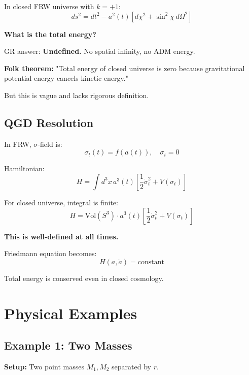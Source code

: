 \documentclass[11pt,a4paper]{article}
\theoremstyle{definition}
\theoremstyle{remark}
\begin{document}
	In closed FRW universe with $k = +1$:
	\begin{equation}
		ds^2 = dt^2 - a^2(t)[d\chi^2 + \sin^2\chi\,d\Omega^2]
	\end{equation}
	
	\textbf{What is the total energy?}
	
	GR answer: \textbf{Undefined.} No spatial infinity, no ADM energy.
	
	\textbf{Folk theorem:} "Total energy of closed universe is zero because gravitational potential energy cancels kinetic energy."
	
	But this is vague and lacks rigorous definition.
	
	\subsection{QGD Resolution}
	
	In FRW, $\sigma$-field is:
	\begin{equation}
		\sigma_t(t) = f(a(t)), \quad \sigma_i = 0
	\end{equation}
	
	Hamiltonian:
	\begin{equation}
		H = \int d^3x\,a^3(t)\left[\frac{1}{2}\dot{\sigma}_t^2 + V(\sigma_t)\right]
	\end{equation}
	
	For closed universe, integral is finite:
	\begin{equation}
		H = \text{Vol}(S^3) \cdot a^3(t)\left[\frac{1}{2}\dot{\sigma}_t^2 + V(\sigma_t)\right]
	\end{equation}
	
	\textbf{This is well-defined at all times.}
	
	Friedmann equation becomes:
	\begin{equation}
		H(a, \dot{a}) = \text{constant}
	\end{equation}
	
	Total energy is conserved even in closed cosmology.
	
	\section{Physical Examples}
	
	\subsection{Example 1: Two Masses}
	
	\textbf{Setup:} Two point masses $M_1, M_2$ separated by $r$.
	
\end{document}
